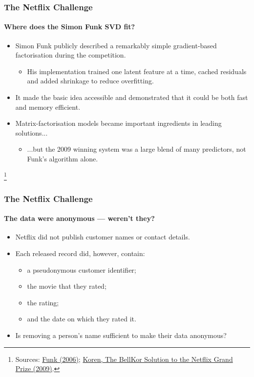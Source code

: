 \documentclass[]{article}
\newcommand\blfootnote[1]{%
  \begingroup
  \renewcommand\thefootnote{}\footnote{#1}%
  \addtocounter{footnote}{-1}%
  \endgroup
}
\begin{document}
\begin{frame}
\frametitle{The Netflix Challenge}
\framesubtitle{Where does the Simon Funk SVD fit?}
\begin{itemize}
	\item<+-> Simon Funk publicly described a remarkably simple gradient-based factorisation during the competition.
	\begin{itemize}
		\item<+-> His implementation trained one latent feature at a time, cached residuals and added shrinkage to reduce overfitting.
	\end{itemize}
	\item<+-> It made the basic idea accessible and demonstrated that it could be both fast and memory efficient.
	\item<+-> Matrix-factorisation models became important ingredients in leading solutions...
	\begin{itemize}
		\item<+-> ...but the 2009 winning system was a large blend of many predictors, not Funk's algorithm alone.
	\end{itemize}
\end{itemize}
\blfootnote{\tiny Sources: \href{https://sifter.org/~simon/journal/20061211.html}{Funk (2006)}; \href{https://www.asc.ohio-state.edu/statistics/dmsl/GrandPrize2009_BPC_BellKor.pdf}{Koren, The BellKor Solution to the Netflix Grand Prize (2009)}.}
\end{frame}

\begin{frame}
\frametitle{The Netflix Challenge}
\framesubtitle{The data were anonymous --- weren't they?}
\begin{itemize}
	\item<+-> Netflix did not publish customer names or contact details.
	\item<+-> Each released record did, however, contain:
	\begin{itemize}
		\item a pseudonymous customer identifier;
		\item the movie that they rated;
		\item the rating;
		\item and the date on which they rated it.
	\end{itemize}
	\item<+-> Is removing a person's name sufficient to make their data anonymous?
\end{itemize}
\end{frame}
\end{document}
